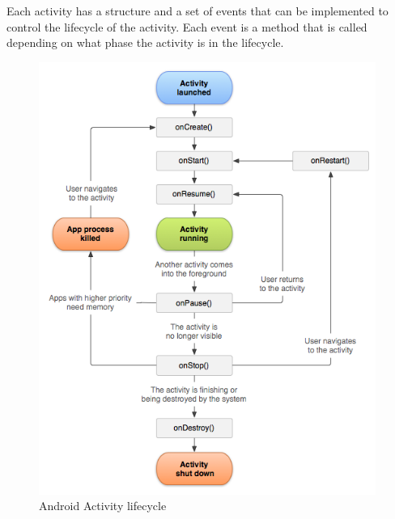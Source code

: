 Each activity has a structure and a set of events that can be implemented to control the lifecycle of the activity. Each event is a method that is called depending on what phase the activity is in the lifecycle.

\begin{figure}[ht!]
\centering
\includegraphics[width=110mm]{activity_lifecycle.png}
\caption{Android Activity lifecycle}
\label{overflow}
\end{figure}

